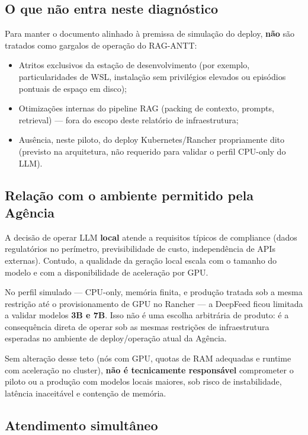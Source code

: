 \documentclass[12pt, a4paper]{article}
\begin{document}
\subsection{O que não entra neste diagnóstico}

Para manter o documento alinhado à premissa de simulação do deploy, \textbf{não} são tratados como gargalos de operação do RAG-ANTT:

\begin{itemize}
  \item Atritos exclusivos da estação de desenvolvimento (por exemplo, particularidades de WSL, instalação sem privilégios elevados ou episódios pontuais de espaço em disco);
  \item Otimizações internas do pipeline RAG (packing de contexto, prompts, retrieval) --- fora do escopo deste relatório de infraestrutura;
  \item Ausência, neste piloto, do deploy Kubernetes/Rancher propriamente dito (previsto na arquitetura, não requerido para validar o perfil CPU-only do LLM).
\end{itemize}

\subsection{Relação com o ambiente permitido pela Agência}

A decisão de operar LLM \textbf{local} atende a requisitos típicos de compliance (dados regulatórios no perímetro, previsibilidade de custo, independência de APIs externas). Contudo, a qualidade da geração local escala com o tamanho do modelo e com a disponibilidade de aceleração por GPU.

No perfil simulado --- CPU-only, memória finita, e produção tratada sob a mesma restrição até o provisionamento de GPU no Rancher --- a DeepFeed ficou limitada a validar modelos \textbf{3B e 7B}. Isso não é uma escolha arbitrária de produto: é a consequência direta de operar sob as mesmas restrições de infraestrutura esperadas no ambiente de deploy/operação atual da Agência.

Sem alteração desse teto (nós com GPU, quotas de RAM adequadas e runtime com aceleração no cluster), \textbf{não é tecnicamente responsável} comprometer o piloto ou a produção com modelos locais maiores, sob risco de instabilidade, latência inaceitável e contenção de memória.

\subsection{Atendimento simultâneo}
\end{document}
